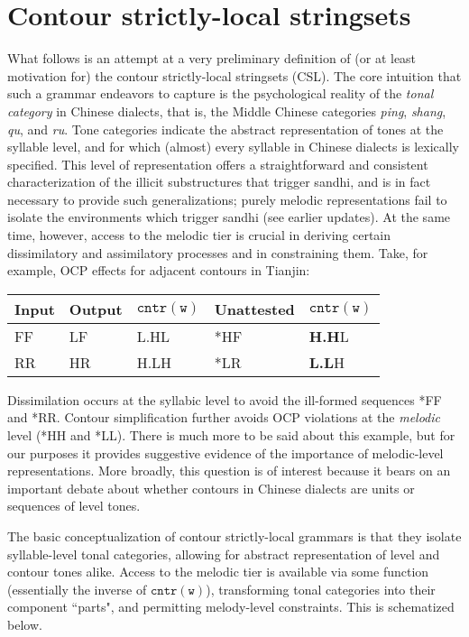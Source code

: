 \documentclass{article}
\begin{document}
\section{Contour strictly-local stringsets}
What follows is an attempt at a very preliminary definition of (or at least motivation for) the contour strictly-local stringsets (CSL). The core intuition that such a grammar endeavors to capture is the psychological reality of the \emph{tonal category} in Chinese dialects, that is, the Middle Chinese categories \emph{ping}, \emph{shang}, \emph{qu}, and \emph{ru}. Tone categories indicate the abstract representation of tones at the syllable level, and for which (almost) every syllable in Chinese dialects is lexically specified. This level of representation offers a straightforward and consistent characterization of the illicit substructures that trigger sandhi, and is in fact necessary to provide such generalizations; purely melodic representations fail to isolate the environments which trigger sandhi (see earlier updates). At the same time, however, access to the melodic tier is crucial in deriving certain dissimilatory and assimilatory processes and in constraining them. Take, for example, OCP effects for adjacent contours in Tianjin:
\begin{exe}
\ex
\begin{tabular}[t]{|l|l|l|l|l|}
\hline
Input & Output & $\mathtt{cntr(w)}$ & Unattested & $\mathtt{cntr(w)}$ \\
\hline
FF & LF & L.HL & *HF & \textbf{H.H}L \\ 
\hline
RR & HR & H.LH & *LR & \textbf{L.L}H \\
\hline
\end{tabular}
\end{exe}
Dissimilation occurs at the syllabic level to avoid the ill-formed sequences *FF and *RR. Contour simplification further avoids OCP violations at the \emph{melodic} level (*HH and *LL). There is much more to be said about this example, but for our purposes it provides suggestive evidence of the importance of melodic-level representations. More broadly, this question is of interest because it bears on an important debate about whether contours in Chinese dialects are units or sequences of level tones.\par
The basic conceptualization of contour strictly-local grammars is that they isolate syllable-level tonal categories, allowing for abstract representation of level and contour tones alike. Access to the melodic tier is available via some function (essentially the inverse of $\mathtt{cntr(w)}$), transforming tonal categories into their component ``parts", and permitting melody-level constraints. This is schematized below.
\end{document}
